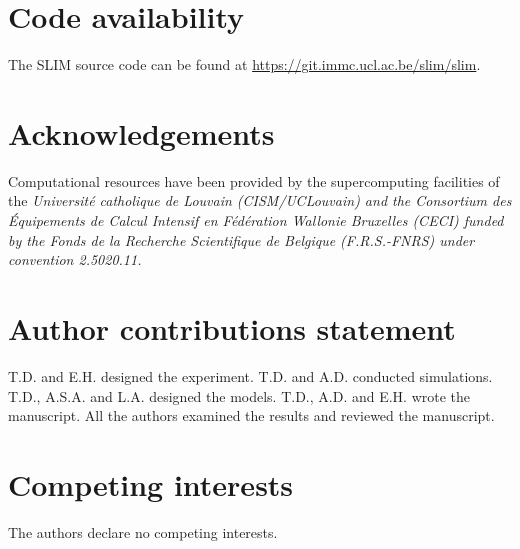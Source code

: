 \documentclass[fleqn,10pt]{wlscirep}
\begin{document}
\section*{Code availability}
The SLIM source code can be found at \href{https://git.immc.ucl.ac.be/slim/slim}{https://git.immc.ucl.ac.be/slim/slim}.





\section*{Acknowledgements}
Computational resources have been provided by the supercomputing facilities of the \it{Universit\'e catholique de Louvain} (CISM/UCLouvain) and the \it{Consortium des \'Equipements de Calcul Intensif en F\'ed\'eration Wallonie Bruxelles} (CECI) funded by the \it{Fonds de la Recherche Scientifique de Belgique} (F.R.S.-FNRS) under convention 2.5020.11.


\section*{Author contributions statement}
T.D. and E.H. designed the experiment. T.D. and A.D. conducted simulations. T.D., A.S.A. and L.A. designed the models. T.D., A.D. and E.H. wrote the manuscript. All the authors examined the results and reviewed the manuscript.


\section*{Competing interests}
The authors declare no competing interests.
\end{document}
